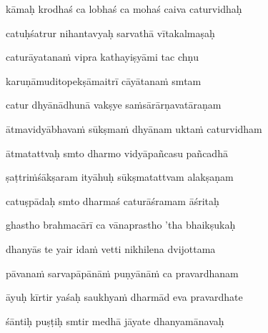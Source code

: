 kāmaḥ krodhaś ca lobhaś ca mohaś caiva caturvidhaḥ\thinspace{\dandab} \dontdisplaylinenum 

catuḥśatrur nihantavyaḥ sarvathā vītakalmaṣaḥ \veg\dontdisplaylinenum

caturāyatana\.m vipra kathayiṣyāmi tac chṇu\thinspace{\dandab} \dontdisplaylinenum

karuṇāmuditopekṣāmaitrī cāyātana\.m smtam \veg\dontdisplaylinenum

catur dhyānādhunā vakṣye sa\.msārārṇavatāraṇam\thinspace{\dandab} \dontdisplaylinenum

ātmavidyābhava\.m sūkṣma\.m dhyānam ukta\.m caturvidham \veg\dontdisplaylinenum

ātmatattvaḥ smto dharmo vidyāpañcasu pañcadhā\thinspace{\dandab} \dontdisplaylinenum

ṣaṭtri\.mśākṣaram ityāhuḥ sūkṣmatattvam alakṣaṇam \veg\dontdisplaylinenum

catuṣpādaḥ smto dharmaś caturāśramam āśritaḥ\thinspace{\dandab} \dontdisplaylinenum

ghastho brahmacārī ca vānaprastho 'tha bhaikṣukaḥ \veg\dontdisplaylinenum

dhanyās te yair ida\.m vetti nikhilena dvijottama\thinspace{\dandab} \dontdisplaylinenum

pāvana\.m sarvapāpānā\.m puṇyānā\.m ca pravardhanam \veg\dontdisplaylinenum

āyuḥ kīrtir yaśaḥ saukhya\.m dharmād eva pravardhate\thinspace{\dandab} \dontdisplaylinenum


śāntiḥ puṣṭiḥ smtir medhā jāyate dhanyamānavaḥ \veg\dontdisplaylinenum 

